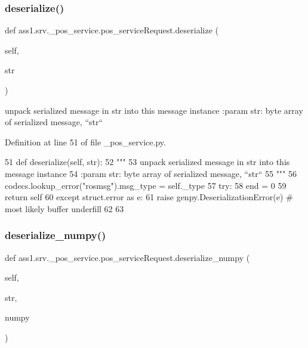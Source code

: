 \subsubsection{\texorpdfstring{deserialize()}{deserialize()}}
{\footnotesize\ttfamily def ass1.\+srv.\+\_\+pos\+\_\+service.\+pos\+\_\+service\+Request.\+deserialize (\begin{DoxyParamCaption}\item[{}]{self,  }\item[{}]{str }\end{DoxyParamCaption})}

\begin{DoxyVerb}unpack serialized message in str into this message instance
:param str: byte array of serialized message, ``str``
\end{DoxyVerb}
 

Definition at line 51 of file \+\_\+pos\+\_\+service.\+py.


\begin{DoxyCode}
51   \textcolor{keyword}{def }deserialize(self, str):
52     \textcolor{stringliteral}{"""}
53 \textcolor{stringliteral}{    unpack serialized message in str into this message instance}
54 \textcolor{stringliteral}{    :param str: byte array of serialized message, ``str``}
55 \textcolor{stringliteral}{    """}
56     codecs.lookup\_error(\textcolor{stringliteral}{"rosmsg"}).msg\_type = self.\_type
57     \textcolor{keywordflow}{try}:
58       end = 0
59       \textcolor{keywordflow}{return} self
60     \textcolor{keywordflow}{except} struct.error \textcolor{keyword}{as} e:
61       \textcolor{keywordflow}{raise} genpy.DeserializationError(e)  \textcolor{comment}{# most likely buffer underfill}
62 
63 
\end{DoxyCode}
\mbox{\label{classass1_1_1srv_1_1__pos__service_1_1pos__serviceRequest_a7f7884f95f196e8a3fc22a34aaeb00cc}} 
\subsubsection{\texorpdfstring{deserialize\+\_\+numpy()}{deserialize\_numpy()}}
{\footnotesize\ttfamily def ass1.\+srv.\+\_\+pos\+\_\+service.\+pos\+\_\+service\+Request.\+deserialize\+\_\+numpy (\begin{DoxyParamCaption}\item[{}]{self,  }\item[{}]{str,  }\item[{}]{numpy }\end{DoxyParamCaption})}

